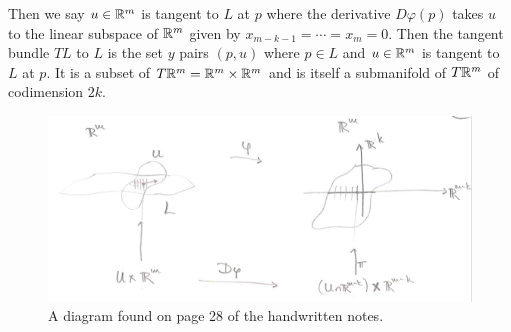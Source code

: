 Then we say $u \in \mathbb{R}^m$ is tangent to $L$ at $p$ where the derivative $D\varphi(p)$
takes $u$ to the linear subspace of $\mathbb{R}^m$ given by $x_{m-k-1} = \cdots = x_m = 0$.
Then the tangent bundle $TL$ to $L$ is the set $y$ pairs $(p,u)$ where $p \in L$ and 
$u \in \mathbb{R}^m$ is tangent to $L$ at $p$. It is a subset of $T \mathbb{R}^m=\mathbb{R}^m \times \mathbb{R}^m$ 
and is itself a submanifold of $T \mathbb{R}^m$ of codimension $2k$.

\begin{figure}[h]
\centering
\includegraphics[width=\textwidth]{im/02-00-p28-pic}
\caption{A diagram found on page 28 of the handwritten notes.}
\end{figure}





